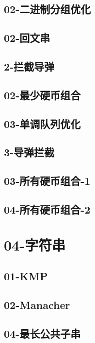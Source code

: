 \documentclass[10pt,a4paper]{article}
\begin{document}
\subsection{02-二进制分组优化}

\subsection{02-回文串}

\subsection{2-拦截导弹}

\subsection{02-最少硬币组合}

\subsection{03-单调队列优化}

\subsection{3-导弹拦截}

\subsection{03-所有硬币组合-1}

\subsection{04-所有硬币组合-2}

\section{04-字符串}
\subsection{01-KMP}

\subsection{02-Manacher}

\subsection{04-最长公共子串}

\end{document}
